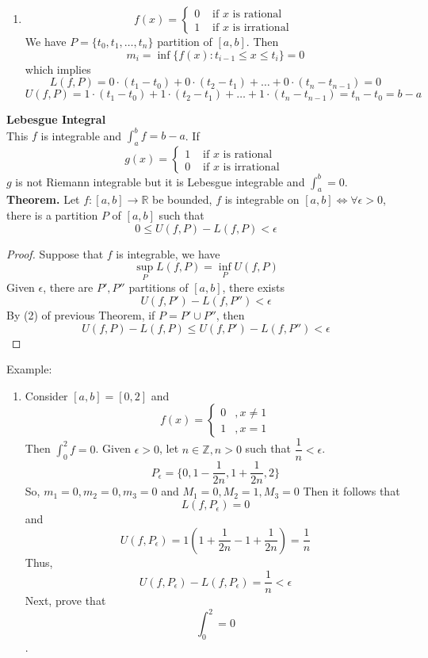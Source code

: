 \documentclass[10pt,letterpaper]{article}
\begin{document}
\begin{enumerate}[(1)]
\begin{enumerate}[(1)]
		\item 
		$$f(x) =
		\begin{cases}
			0  & \text{ if } x \text{ is rational } \\
			1  & \text{ if } x \text{ is irrational } 
		\end{cases}
		$$
		We have $P = \{t_0, t_1, \ldots, t_n\}$ partition of $[a, b]$. Then
		$$m_i = \inf\{f(x) : t_{i-1} \leq x \leq t_i\} = 0$$
		which implies 
		$$L(f, P) = 0 \cdot (t_1 - t_0) + 0 \cdot (t_2 - t_1) + \ldots + 0 \cdot (t_n - t_{n-1}) = 0$$
		$$U(f, P) = 1 \cdot (t_1 - t_0) + 1 \cdot (t_2 - t_1) + \ldots + 1 \cdot (t_n - t_{n-1}) = t_n - t_0 = b - a$$
		\end{enumerate}
	\end{enumerate}
	
	\textbf{{\color{purple}Lebesgue Integral}} \\
	This $f$ is integrable and $\displaystyle\int_{a}^{b} f = b - a$. 
	If 
	$$g(x) = 
	\begin{cases}
		1 & \text{ if } x \text{ is rational } \\
		0 & \text{ if } x \text{ is irrational } 
	\end{cases}				
	$$
	$g$ is not Riemann integrable but it is Lebesgue integrable and $\displaystyle\int_{a}^{b} = 0$. \\
	
	\textbf{{\color{red}Theorem. }} Let $f: [a, b] \rightarrow \mathbb{R}$ be bounded, 
	$f$ is integrable on $[a, b] \Leftrightarrow \forall \epsilon > 0$, there is a
	partition $P$ of $[a, b]$ such that 
	$$0 \leq U(f, P) - L(f, P) < \epsilon$$
	\begin{proof}
		Suppose that $f$ is integrable, we have
		$$\sup_P L(f, P) = \inf_P U(f, P)$$
		Given $\epsilon$, there are $P', P''$ partitions of $[a, b]$, there exists
		$$U(f, P') - L(f, P'') < \epsilon$$
		By (2) of previous Theorem, if $P = P' \cup P''$, then
		$$U(f, P) - L(f, P) \leq U(f, P') - L(f, P'') < \epsilon$$ 	
	\end{proof}

	Example: \\
	\begin{enumerate}[(1)]
		\item Consider $[a, b] = [0, 2]$ and 
		$$f(x) = 
		\begin{cases}
			0 &, x \neq 1 \\
			1 &, x = 1
		\end{cases}
		$$
		Then $\int_{0}^{2} f = 0$.
		Given $\epsilon > 0$, let $n \in \mathbb{Z}, n > 0$ such that $\dfrac{1}{n} < \epsilon$.
		$$P_{\epsilon} = \{0, 1 - \dfrac{1}{2n}, 1 + \dfrac{1}{2n}, 2\}$$
		So, 
		$m_1 = 0, m_2 = 0, m_3 = 0$ and $M_1 = 0, M_2 = 1, M_3  = 0$
		Then it follows that
		$$L(f, P_{\epsilon}) = 0$$
		and $$U(f, P_{\epsilon}) = 1(1 + \dfrac{1}{2n} - 1 + \dfrac{1}{2n}) = \dfrac{1}{n}$$
		Thus,		
		$$U(f, P_{\epsilon}) - L(f, P_{\epsilon}) = \dfrac{1}{n} < \epsilon$$	
		Next, prove that $$\displaystyle\int_{0}^{2} = 0$$.
	\end{enumerate}
	 
\end{document}
